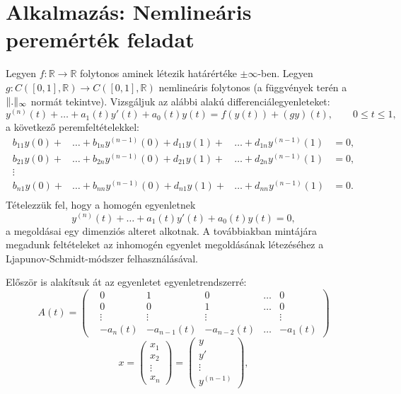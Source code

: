\documentclass[oneside, titlepage, 12pt, a4paper]{report}
\DeclarePairedDelimiter\norm{\lVert}{\rVert}	%
\begin{document}
\section{Alkalmazás: Nemlineáris peremérték feladat}
\label{sec:Nonlinboundary}
Legyen $f : \mathbb{R} \rightarrow \mathbb{R}$ folytonos aminek létezik határértéke $\pm \infty$-ben. Legyen $g : C([0, 1], \mathbb{R}) \rightarrow C([0, 1], \mathbb{R})$ nemlineáris folytonos (a függvények terén a $\norm{.}_\infty$ normát tekintve). Vizsgáljuk az alábbi alakú differenciálegyenleteket:
\begin{equation}
\label{eq:Nonlinboundaryeq}
y^{(n)}(t) + \dots + a_1(t) y'(t) + a_0(t) y(t) = f(y(t)) + (gy)(t), \qquad 0 \le t \le 1,
\end{equation}
a következő peremfeltételekkel:
\begin{align*}
b_{11} y(0) + &\dots + b_{1n} y^{(n-1)}(0) + d_{11} y(1) + &\dots + d_{1n} y^{(n - 1)}(1) &= 0, \\
b_{21} y(0) + &\dots + b_{2n} y^{(n-1)}(0) + d_{21} y(1) + &\dots + d_{2n} y^{(n - 1)}(1) &= 0, \\
\vdots \\
b_{n1} y(0) + &\dots + b_{nn} y^{(n-1)}(0) + d_{n1} y(1) + &\dots + d_{nn} y^{(n - 1)}(1) &= 0. \\
\end{align*}
Tételezzük fel, hogy a homogén egyenletnek
\begin{equation*}
y^{(n)}(t) + \dots + a_1(t) y'(t) + a_0(t) y(t) = 0,
\end{equation*}
a megoldásai egy dimenziós alteret alkotnak. A továbbiakban \cite{RodriguezAbernathy} mintájára megadunk feltételeket az inhomogén egyenlet megoldásának létezéséhez a Ljapunov-Schmidt-módszer felhasználásával. \par
Először is alakítsuk át az egyenletet egyenletrendszerré:
\begin{equation*}
A(t) = \left(
\begin{matrix}
&0 &1 &0 &\dots &0 \\
&0 &0 &1 &\dots &0 \\
&\vdots &\vdots &\vdots & &\vdots \\
&-a_n(t) &-a_{n - 1}(t) &-a_{n - 2}(t) &\dots &-a_1(t)
\end{matrix}
\right)
\end{equation*}
\begin{equation*}
x = \left(
\begin{array}{c}
x_1 \\
x_2 \\
\vdots \\
x_n
\end{array}
\right) = \left(
\begin{array}{c}
y \\
y' \\
\vdots \\
y^{(n - 1)}
\end{array}
\right),
\end{equation*}
\end{document}
